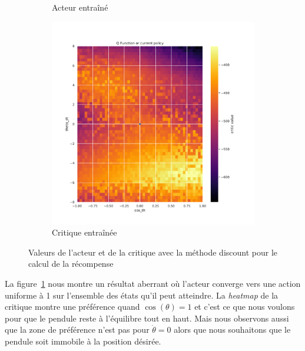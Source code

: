 \begin{figure}[H]
\begin{subfigure}{0.3\textwidth}
        \caption{Acteur entraîné}
    \end{subfigure}
    \begin{subfigure}{0.3\textwidth}
        \includegraphics[width=\textwidth]{figures/prelimaire/0_critic_discount_post_Pendulum-v0.pdf}
        \caption{Critique entraînée}
    \end{subfigure}
    \caption{Valeurs de l'acteur et de la critique avec la méthode discount pour le calcul de la récompense}
    \label{fig:preli_discount}
\end{figure}

La figure~\ref{fig:preli_discount} nous montre un résultat aberrant où l'acteur converge vers une action uniforme à 1 sur l'ensemble des états qu'il peut atteindre. La \emph{heatmap} de la critique montre une préférence quand $\cos(\theta) = 1$ et c'est ce que nous voulons pour que le pendule reste à l'équilibre tout en haut. Mais nous observons aussi que la zone de préférence n'est pas pour $\dot{\theta} = 0$ alors que nous souhaitons que le pendule soit immobile à la position désirée.

